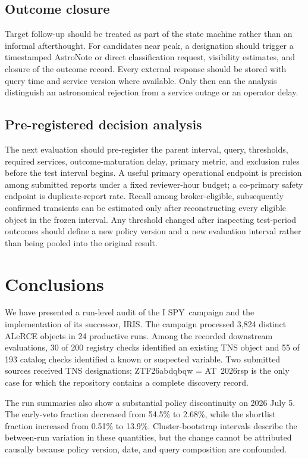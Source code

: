 \documentclass[11pt]{article}
\newcommand{\project}{I SPY}
\newcommand{\iris}{IRIS}
\begin{document}
\subsection{Outcome closure}

Target follow-up should be treated as part of the state machine rather than an informal afterthought. For candidates near peak, a designation should trigger a timestamped AstroNote or direct classification request, visibility estimates, and closure of the outcome record. Every external response should be stored with query time and service version where available. Only then can the analysis distinguish an astronomical rejection from a service outage or an operator delay.

\subsection{Pre-registered decision analysis}

The next evaluation should pre-register the parent interval, query, thresholds, required services, outcome-maturation delay, primary metric, and exclusion rules before the test interval begins. A useful primary operational endpoint is precision among submitted reports under a fixed reviewer-hour budget; a co-primary safety endpoint is duplicate-report rate. Recall among broker-eligible, subsequently confirmed transients can be estimated only after reconstructing every eligible object in the frozen interval. Any threshold changed after inspecting test-period outcomes should define a new policy version and a new evaluation interval rather than being pooled into the original result.


\section{Conclusions}

We have presented a run-level audit of the \project\ campaign and the implementation of its successor, \iris. The campaign processed 3,824 distinct ALeRCE objects in 24 productive runs. Among the recorded downstream evaluations, 30 of 200 registry checks identified an existing TNS object and 55 of 193 catalog checks identified a known or suspected variable. Two submitted sources received TNS designations; ZTF26abdqbqw = AT~2026rsp is the only case for which the repository contains a complete discovery record.

The run summaries also show a substantial policy discontinuity on 2026 July 5. The early-veto fraction decreased from 54.5\% to 2.68\%, while the shortlist fraction increased from 0.51\% to 13.9\%. Cluster-bootstrap intervals describe the between-run variation in these quantities, but the change cannot be attributed causally because policy version, date, and query composition are confounded.
\end{document}

